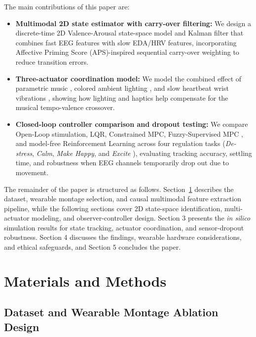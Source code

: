 \documentclass[a4paper,fleqn]{cas-dc}
\begin{document}
The main contributions of this paper are:
\begin{itemize}
    \item \textbf{Multimodal 2D state estimator with carry-over filtering:} We design a discrete-time 2D Valence-Arousal state-space model and Kalman filter that combines fast EEG features with slow EDA/HRV features, incorporating Affective Priming Score (APS)-inspired \cite{gutierrez2025affective} sequential carry-over weighting to reduce transition errors.
    \item \textbf{Three-actuator coordination model:} We model the combined effect of parametric music \cite{ehrlich2019closed,agres2023affectmachine,agres2025affectmachine}, colored ambient lighting \cite{li2025designing}, and slow heartbeat wrist vibrations \cite{azevedo2017calming}, showing how lighting and haptics help compensate for the musical tempo-valence crossover.
    \item \textbf{Closed-loop controller comparison and dropout testing:} We compare Open-Loop stimulation, LQR, Constrained MPC, Fuzzy-Supervised MPC \cite{azgomi2022enhancement}, and model-free Reinforcement Learning \cite{pohlmeyer2014using} across four regulation tasks (\textit{De-stress}, \textit{Calm}, \textit{Make Happy}, and \textit{Excite} \cite{daly2016affective}), evaluating tracking accuracy, settling time, and robustness when EEG channels temporarily drop out due to movement.
\end{itemize}

The remainder of the paper is structured as follows. Section~\ref{sec:methods} describes the dataset, wearable montage selection, and causal multimodal feature extraction pipeline, while the following sections cover 2D state-space identification, multi-actuator modeling, and observer-controller design. Section 3 presents the \textit{in silico} simulation results for state tracking, actuator coordination, and sensor-dropout robustness. Section 4 discusses the findings, wearable hardware considerations, and ethical safeguards, and Section 5 concludes the paper.

\section{Materials and Methods}\label{sec:methods}

\subsection{Dataset and Wearable Montage Ablation Design}\label{subsec:dataset}
\end{document}
